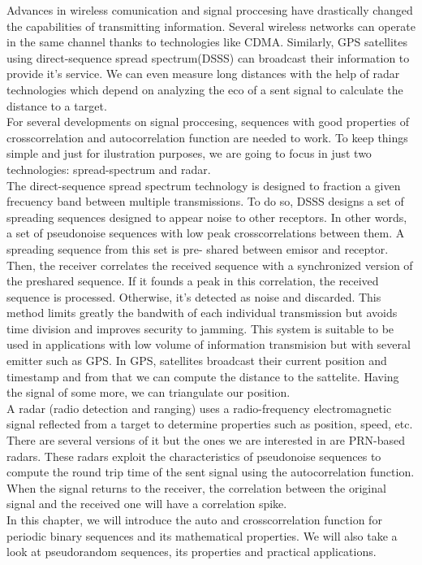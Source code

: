 Advances in wireless comunication and signal proccesing have drastically
changed the capabilities of transmitting information. Several wireless
networks can operate in the same channel thanks to technologies like
CDMA. Similarly, GPS\cite{GPS} satellites using direct-sequence spread
spectrum(DSSS) can broadcast their information to provide it's service. We can
even measure long distances with the help of radar technologies which depend on
analyzing the eco of a sent signal to calculate the distance to a target.\\

For several developments on signal proccesing, sequences with good properties
of crosscorrelation and autocorrelation function are needed to work. To keep
things simple and just for ilustration purposes, we are going to focus in just
two technologies: spread-spectrum and radar.\\

The direct-sequence spread spectrum technology\cite{DSSS_1}\cite{DSSS} is
designed to fraction a given frecuency band between multiple transmissions. To
do so, DSSS designs a set of spreading sequences designed to appear noise to
other receptors. In other words, a set of pseudonoise sequences with low peak
crosscorrelations between them. A spreading sequence from this set is pre-
shared between emisor and receptor. Then, the receiver correlates the received
sequence with a synchronized version of the preshared sequence. If it founds a
peak in this correlation, the received sequence is processed. Otherwise, it's
detected as noise and discarded. This method limits greatly the bandwith of
each individual transmission but avoids time division and improves security to
jamming. This system is suitable to be used in applications with low volume
of information transmision but with several emitter such as GPS. In GPS,
satellites broadcast their current position and timestamp and from that
we can compute the distance to the sattelite. Having the signal of some more,
we can triangulate our position.\\


A radar (radio detection and ranging) uses a radio-frequency electromagnetic
signal reflected from a target to determine properties such as position, speed,
etc. There are several versions of it but the ones we are interested in are
PRN-based radars\cite{prn_radar_example1}\cite{prn_radar_example2}. These
radars exploit the characteristics of pseudonoise sequences to compute the
round trip time of the sent signal using the autocorrelation function. When
the signal returns to the receiver, the correlation between the original
signal and the received one will have a correlation spike.\\

In this chapter, we will introduce the  auto and crosscorrelation function for
periodic binary sequences and its mathematical properties. We will also take a
look at pseudorandom sequences, its properties and practical applications.

 
